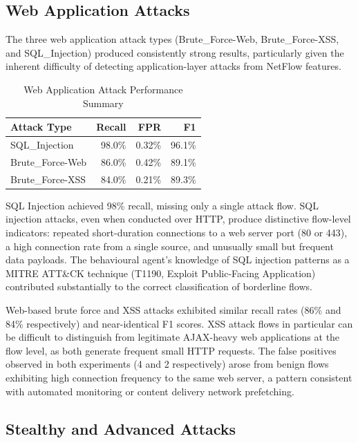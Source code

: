 \subsection{Web Application Attacks}
\label{sec:web-attacks}

The three web application attack types (Brute\_Force-Web, Brute\_Force-XSS, and SQL\_Injection) produced consistently strong results, particularly given the inherent difficulty of detecting application-layer attacks from NetFlow features.

\begin{table}[H]
\centering
\caption{Web Application Attack Performance Summary}
\label{tab:web-performance}
\begin{tabular}{l r r r}
\toprule
Attack Type & Recall & FPR & F1 \\
\midrule
SQL\_Injection & 98.0\% & 0.32\% & 96.1\% \\
Brute\_Force-Web & 86.0\% & 0.42\% & 89.1\% \\
Brute\_Force-XSS & 84.0\% & 0.21\% & 89.3\% \\
\bottomrule
\end{tabular}
\end{table}

SQL Injection achieved 98\% recall, missing only a single attack flow. SQL injection attacks, even when conducted over HTTP, produce distinctive flow-level indicators: repeated short-duration connections to a web server port (80 or 443), a high connection rate from a single source, and unusually small but frequent data payloads. The behavioural agent's knowledge of SQL injection patterns as a MITRE ATT\&CK technique (T1190, Exploit Public-Facing Application) contributed substantially to the correct classification of borderline flows.

Web-based brute force and XSS attacks exhibited similar recall rates (86\% and 84\% respectively) and near-identical F1 scores. XSS attack flows in particular can be difficult to distinguish from legitimate AJAX-heavy web applications at the flow level, as both generate frequent small HTTP requests. The false positives observed in both experiments (4 and 2 respectively) arose from benign flows exhibiting high connection frequency to the same web server, a pattern consistent with automated monitoring or content delivery network prefetching.

\subsection{Stealthy and Advanced Attacks}
\label{sec:stealthy-attacks}

